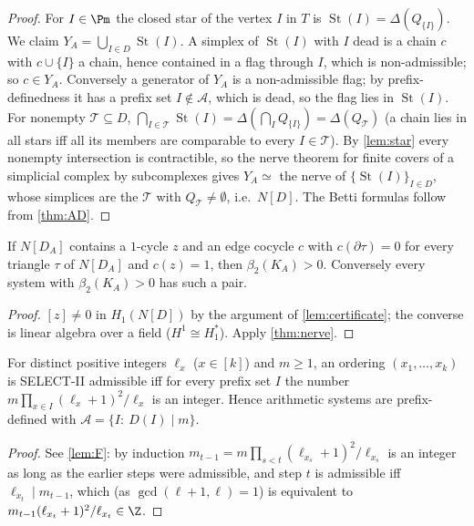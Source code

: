 \begin{proof}
For $I\in\Pm$ the closed star of the vertex $I$ in $T$ is $\operatorname{St}(I)=\Delta(Q_{\{I\}})$. We claim $Y_A=\bigcup_{I\in D}\operatorname{St}(I)$. A simplex of $\operatorname{St}(I)$ with $I$ dead is a chain $c$ with $c\cup\{I\}$ a chain, hence contained in a flag through $I$, which is non-admissible; so $c\in Y_A$. Conversely a generator of $Y_A$ is a non-admissible flag; by prefix-definedness it has a prefix set $I\notin\mathcal A$, which is dead, so the flag lies in $\operatorname{St}(I)$. For nonempty $\mathcal T\subseteq D$,
$\bigcap_{I\in\mathcal T}\operatorname{St}(I)=\Delta(\bigcap_IQ_{\{I\}})=\Delta(Q_{\mathcal T})$ (a chain lies in all stars iff all its members are comparable to every $I\in\mathcal T$). By \cref{lem:star} every nonempty intersection is contractible, so the nerve theorem for finite covers of a simplicial complex by subcomplexes gives $Y_A\simeq$ the nerve of $\{\operatorname{St}(I)\}_{I\in D}$, whose simplices are the $\mathcal T$ with $Q_{\mathcal T}\ne\emptyset$, i.e.\ $N[D]$. The Betti formulas follow from \cref{thm:AD}.
\end{proof}
\begin{corollary}\label{cor:dead-cert}
If $N[D_A]$ contains a $1$-cycle $z$ and an edge cocycle $c$ with $c(\partial\tau)=0$ for every triangle $\tau$ of $N[D_A]$ and $c(z)=1$, then $\beta_2(K_A)>0$. Conversely every system with $\beta_2(K_A)>0$ has such a pair.
\end{corollary}
\begin{proof}
$[z]\neq0$ in $H_1(N[D])$ by the argument of \cref{lem:certificate}; the converse is linear algebra over a field ($H^1\cong H_1^\ast$). Apply \cref{thm:nerve}.
\end{proof}
\begin{proposition}\label{prop:arith-prefix}
For distinct positive integers $\ell_x$ ($x\in[k]$) and $m\ge1$, an ordering $(x_1,\dots,x_k)$ is SELECT-II admissible iff for every prefix set $I$ the number $m\prod_{x\in I}(\ell_x+1)^2/\ell_x$ is an integer. Hence arithmetic systems are prefix-defined with $\mathcal A=\{I:\ D(I)\mid m\}$.
\end{proposition}
\begin{proof}
See \cref{lem:F}: by induction $m_{t-1}=m\prod_{s<t}(\ell_{x_s}+1)^2/\ell_{x_s}$ is an integer as long as the earlier steps were admissible, and step $t$ is admissible iff $\ell_{x_t}\mid m_{t-1}$, which (as $\gcd(\ell+1,\ell)=1$) is equivalent to $m_{t-1}(\ell_{x_t}+1)^2/\ell_{x_t}\in\Z$.
\end{proof}

